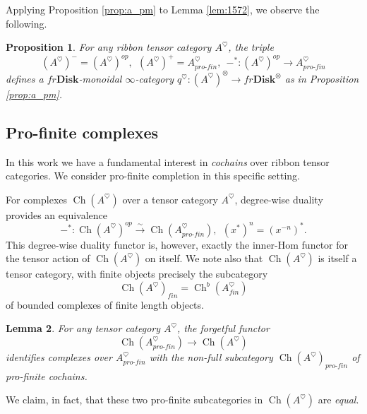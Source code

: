 \documentclass[reqno]{amsart}
\newtheorem{lemma}{Lemma}[section]
\newtheorem{proposition}[lemma]{Proposition}
\theoremstyle{definition}
\newcommand{\opn}[1]{\operatorname{#1}}
\newcommand{\ot}{\otimes}
\newcommand{\Disk}{\mathbf{Disk}}
\newcommand{\pf}{pro\text{-}fin}
\renewcommand{\1}{\mathbf{1}}
\begin{document}
Applying Proposition \ref{prop:a_pm} to Lemma \ref{lem:1572}, we observe the following.

\begin{proposition}\label{prop:fr_heartsuit}
For any ribbon tensor category $A^{\heartsuit}$, the triple
\[
(A^{\heartsuit})^-=(A^{\heartsuit})^{op},\ \ (A^{\heartsuit})^+=A^{\heartsuit}_{\pf},\ \ -^{\ast}:(A^{\heartsuit})^{op}\to A^{\heartsuit}_{\pf}
\]
defines a $fr\Disk$-monoidal $\infty$-category $q^{\heartsuit}:(A^{\heartsuit})^{\ot}\to fr\Disk^{\ot}$ as in Proposition \ref{prop:a_pm}.
\end{proposition}

\subsection{Pro-finite complexes}
\label{sect:pf_complexes}

In this work we have a fundamental interest in \emph{cochains} over ribbon tensor categories. We consider pro-finite completion in this specific setting.

For complexes $\opn{Ch}(A^{\heartsuit})$ over a tensor category $A^{\heartsuit}$, degree-wise duality provides an equivalence
\begin{equation}\label{eq:1608}
-^{\ast}:\opn{Ch}(A^{\heartsuit})^{op}\overset{\sim}\to \opn{Ch}(A^{\heartsuit}_{\pf}),\ \ (x^{\ast})^n=(x^{-n})^{\ast}.
\end{equation}
This degree-wise duality functor is, however, exactly the inner-Hom functor for the tensor action of $\opn{Ch}(A^{\heartsuit})$ on itself.  We note also that $\opn{Ch}(A^{\heartsuit})$ is itself a tensor category, with finite objects precisely the subcategory
\[
\opn{Ch}(A^{\heartsuit})_{fin}=\opn{Ch}^b(A^{\heartsuit}_{fin})
\]
of bounded complexes of finite length objects.

\begin{lemma}
For any tensor category $A^{\heartsuit}$, the forgetful functor
\[
\opn{Ch}(A^{\heartsuit}_{\pf})\to \opn{Ch}(A^{\heartsuit})
\]
identifies complexes over $A^{\heartsuit}_{\pf}$ with the non-full subcategory $\opn{Ch}(A^{\heartsuit})_{\pf}$ of pro-finite cochains.
\end{lemma}

We claim, in fact, that these two pro-finite subcategories in $\opn{Ch}(A^{\heartsuit})$ are \emph{equal}.
\end{document}
